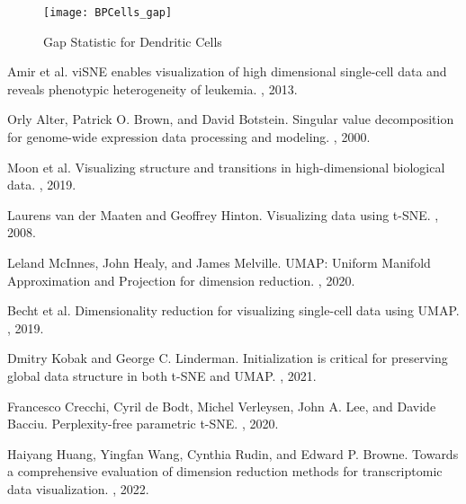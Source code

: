 \documentclass{article}
\begin{document}
\begin{figure}[H]
\centering
\texttt{[image: BPCells\_gap]}
\caption{Gap Statistic for Dendritic Cells}
\end{figure}

\newpage



\begin{thebibliography}{10}

Amir et al.
\newblock viSNE enables visualization of high dimensional single-cell data and reveals phenotypic heterogeneity of leukemia.
, 2013.

Orly Alter, Patrick O. Brown, and David Botstein.
\newblock Singular value decomposition for genome-wide expression data processing and modeling.
, 2000.

Moon et al.
\newblock Visualizing structure and transitions in high-dimensional biological data.
, 2019.

Laurens van der Maaten and Geoffrey Hinton.
\newblock Visualizing data using t-SNE.
, 2008.

Leland McInnes, John Healy, and James Melville.
\newblock UMAP: Uniform Manifold Approximation and Projection for dimension reduction.
, 2020.

Becht et al.
\newblock Dimensionality reduction for visualizing single-cell data using UMAP.
, 2019.

Dmitry Kobak and George C. Linderman.
\newblock Initialization is critical for preserving global data structure in both t-SNE and UMAP.
, 2021.

Francesco Crecchi, Cyril de Bodt, Michel Verleysen, John A. Lee, and Davide Bacciu.
\newblock Perplexity-free parametric t-SNE.
, 2020.

Haiyang Huang, Yingfan Wang, Cynthia Rudin, and Edward P. Browne.
\newblock Towards a comprehensive evaluation of dimension reduction methods for transcriptomic data visualization.
, 2022.


\end{thebibliography}
\end{document}

